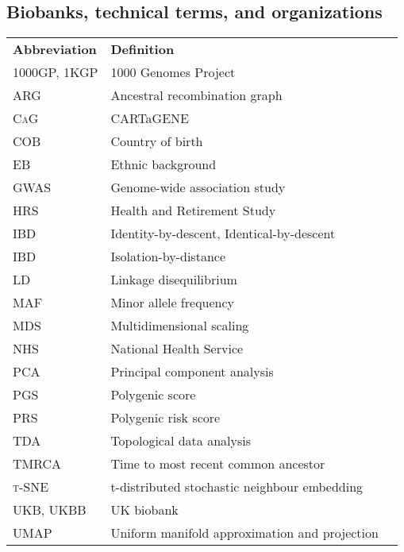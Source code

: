 
\subsection*{Biobanks, technical terms, and organizations}

\begin{table}[!h]
\hspace{1.0cm}
\begin{tabular}{l l r}

\textbf{Abbreviation} & \textbf{Definition} \\ [1ex]
\textsc{1000GP, 1KGP}  &  1000 Genomes Project \\ [1ex]
\textsc{ARG}  &  Ancestral recombination graph \\ [1ex]
\textsc{CaG}  &  CARTaGENE \\ [1ex]
\textsc{COB}  &  Country of birth \\ [1ex]
\textsc{EB}  &  Ethnic background \\ [1ex]
\textsc{GWAS}  &  Genome-wide association study \\ [1ex]
\textsc{HRS}  &  Health and Retirement Study \\ [1ex]
\textsc{IBD}  &  Identity-by-descent, Identical-by-descent\\ [1ex]
\textsc{IBD}  &  Isolation-by-distance \\ [1ex]
\textsc{LD}  &  Linkage disequilibrium \\ [1ex]
\textsc{MAF}  &  Minor allele frequency \\ [1ex]
\textsc{MDS}  &  Multidimensional scaling \\ [1ex]
\textsc{NHS}  &  National Health Service \\ [1ex]
\textsc{PCA}  & Principal component analysis \\ [1ex]
\textsc{PGS}  &  Polygenic score \\ [1ex]
\textsc{PRS}  &  Polygenic risk score \\ [1ex]
\textsc{TDA}  &  Topological data analysis \\ [1ex]
\textsc{TMRCA}  &  Time to most recent common ancestor \\ [1ex]
\textsc{{t}-SNE}  &  t-distributed stochastic neighbour embedding \\ [1ex]
\textsc{UKB, UKBB}  &  UK biobank \\ [1ex]
\textsc{UMAP}  &  Uniform manifold approximation and projection \\ [1ex]

\end{tabular}
\end{table}

